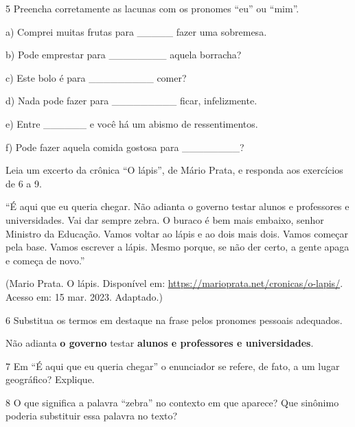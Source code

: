 \num{5} Preencha corretamente as lacunas com os pronomes ``eu'' ou
``mim''.

a) Comprei muitas frutas para \_\_\_\_\_ fazer uma sobremesa.

b) Pode emprestar para \_\_\_\_\_\_\_\_ aquela borracha?

c) Este bolo é para \_\_\_\_\_\_\_\_\_ comer?

d) Nada pode fazer para \_\_\_\_\_\_\_\_\_ ficar, infelizmente.

e) Entre \_\_\_\_\_\_ e você há um abismo de ressentimentos.

f) Pode fazer aquela comida gostosa para \_\_\_\_\_\_\_\_?


Leia um excerto da crônica ``O lápis'', de Mário Prata, e responda aos
exercícios de 6 a 9.

``É aqui que eu queria chegar. Não adianta o governo testar alunos e
professores e universidades. Vai dar sempre zebra. O buraco é bem mais
embaixo, senhor Ministro da Educação. Vamos voltar ao lápis e ao dois
mais dois. Vamos começar pela base. Vamos escrever a lápis. Mesmo
porque, se não der certo, a gente apaga e começa de novo.''

(Mario Prata. O lápis. Disponível em:
\url{https://marioprata.net/cronicas/o-lapis/}. Acesso em: 15 mar. 2023.
Adaptado.)

\num{6} Substitua os termos em destaque na frase pelos pronomes pessoais
adequados.

Não adianta \textbf{o governo} testar \textbf{alunos e professores e
universidades}.



\num{7} Em ``É aqui que eu queria chegar'' o enunciador se refere, de
fato, a um lugar geográfico? Explique.



\num{8} O que significa a palavra ``zebra'' no contexto em que aparece?
Que sinônimo poderia substituir essa palavra no texto?




